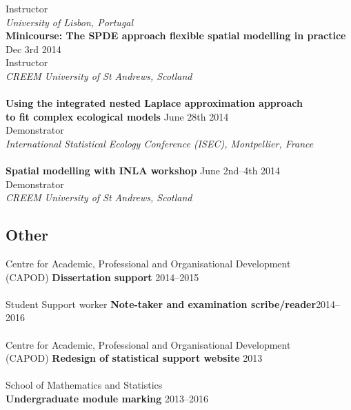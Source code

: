 \documentclass[10pt,letter]{article}
\begin{document}
 Instructor\\
 {\sl University of Lisbon, Portugal}\\
 \newpage
 \noindent
  {\textbf{{Minicourse: The SPDE approach flexible spatial modelling in practice}}} \hfill Dec 3rd  2014\\
 Instructor\\
 {\sl CREEM University of St Andrews, Scotland}\\ 
 \hdashrule[0.5ex]{4cm}{1pt}{1pt}\\
\noindent
    \textbf {Using the integrated nested Laplace approximation approach} \\
    \textbf{to fit complex ecological models}  \hfill June 28th 2014\\
 Demonstrator\\
 {\sl International Statistical Ecology Conference (ISEC), Montpellier, France}\\
 \hdashrule[0.5ex]{4cm}{1pt}{1pt}\\
{\textbf{{Spatial modelling with INLA workshop}}} \hfill June 2nd--4th  2014\\
 Demonstrator\\
 {\sl CREEM University of St Andrews, Scotland}\\ 

  \vspace{1mm}
 \subsection*{Other}
 \vspace{1mm}

 
 Centre for Academic, Professional and Organisational Development\\ (CAPOD) \textbf{Dissertation support} \hfill{2014--2015}\\
 \hdashrule[0.5ex]{4cm}{1pt}{1pt}\\
Student Support worker \textbf{Note-taker and examination scribe/reader}\hfill {2014--2016}\\
\hdashrule[0.5ex]{4cm}{1pt}{1pt}\\
 Centre for Academic, Professional and Organisational Development\\ (CAPOD) \textbf{Redesign of statistical support website} \hfill{2013}\\
 \hdashrule[0.5ex]{4cm}{1pt}{1pt}\\
School of Mathematics and Statistics\\ \textbf{Undergraduate module marking} \hfill{2013--2016}\\
 
\end{document}

